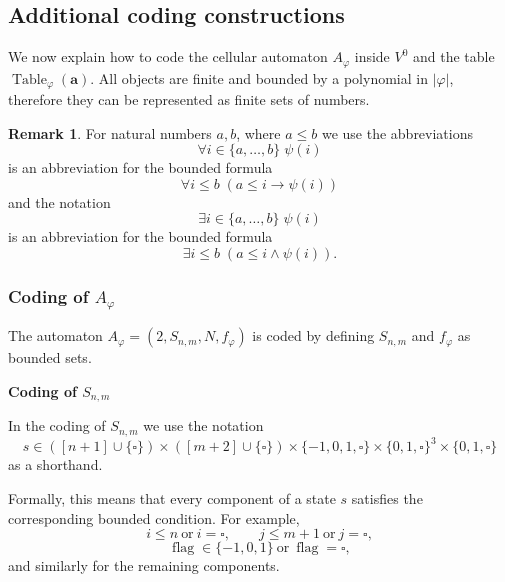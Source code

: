 \documentclass{article}
\theoremstyle{plain}
\theoremstyle{definition}
\newtheorem{remark}[theorem]{Remark}
\DeclareMathOperator{\Table}{Table}
\DeclareMathOperator{\flag}{flag}
\newcommand{\tuple}{\mathbf}
\begin{document}
\subsection{Additional coding constructions}
We now explain how to code the cellular automaton $A_\varphi$ inside $V^0$ and the table $\Table_\varphi(\tuple a)$.  
All objects are finite and bounded by a polynomial in $|\varphi|$, therefore they can be represented as finite sets of numbers.

\begin{remark}
     For natural numbers $a,b$, where $a\leq b$ we use the abbreviations
\[
\forall i \in \{a, \dots, b\} \; \psi(i)
\]
is an abbreviation for the bounded formula
\[
\forall i\leq b \; (a \leq i \rightarrow \psi(i))
\]
and the notation
\[
\exists i \in \{a, \dots, b\} \; \psi(i)
\]
is an abbreviation for the bounded formula
\[
\exists i\leq b \; (a \leq i \wedge \psi(i)).
\]

\end{remark}

\subsubsection{Coding of $A_\varphi$}\label{subsub:coding_af}

The automaton $A_\varphi=(2,S_{n,m},N,f_\varphi)$ is coded by defining $S_{n,m}$ and $f_\varphi$ as bounded sets.

\textbf{Coding of $S_{n,m}$}

In the coding of $S_{n,m}$ we use the notation
\[
s \in ([n+1] \cup \{\square\}) \times ([m+2] \cup \{\square\})
\times \{-1,0,1,\square\} \times \{0,1,\square\}^3 \times \{0,1,\square\}
\]
as a shorthand.

Formally, this means that every component of a state $s$
satisfies the corresponding bounded condition. For example,
\[
i \leq n \ \text{or}\ i=\square,
\qquad
j \leq m+1\ \text{or}\ j=\square,
\]
\[
\flag \in \{-1,0,1\} \ \text{or}\ \flag=\square,
\]
and similarly for the remaining components.
\end{document}
